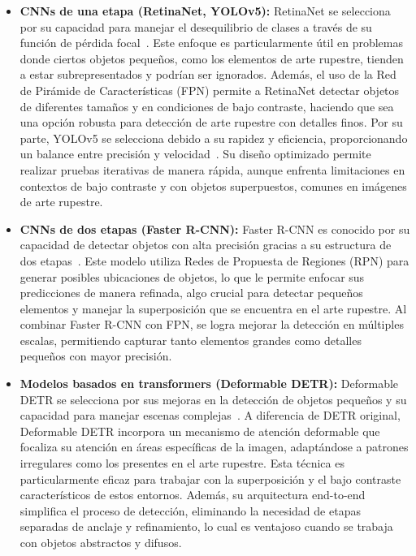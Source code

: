 \begin{itemize}
    \item \textbf{CNNs de una etapa (RetinaNet, YOLOv5):}
    RetinaNet se selecciona por su capacidad para manejar el desequilibrio de clases a través de su función de pérdida focal~\cite{lin2017focal}.
    Este enfoque es particularmente útil en problemas donde ciertos objetos pequeños, como los elementos de arte rupestre, tienden a estar subrepresentados y podrían ser ignorados.
    Además, el uso de la Red de Pirámide de Características (FPN) permite a RetinaNet detectar objetos de diferentes tamaños y en condiciones de bajo contraste, haciendo que sea una opción robusta para detección de arte rupestre con detalles finos.
    Por su parte, YOLOv5 se selecciona debido a su rapidez y eficiencia, proporcionando un balance entre precisión y velocidad~\cite{yolov5}.
    Su diseño optimizado permite realizar pruebas iterativas de manera rápida, aunque enfrenta limitaciones en contextos de bajo contraste y con objetos superpuestos, comunes en imágenes de arte rupestre.

    \item \textbf{CNNs de dos etapas (Faster R-CNN):}
    Faster R-CNN es conocido por su capacidad de detectar objetos con alta precisión gracias a su estructura de dos etapas~\cite{ren2015faster}.
    Este modelo utiliza Redes de Propuesta de Regiones (RPN) para generar posibles ubicaciones de objetos, lo que le permite enfocar sus predicciones de manera refinada, algo crucial para detectar pequeños elementos y manejar la superposición que se encuentra en el arte rupestre.
    Al combinar Faster R-CNN con FPN, se logra mejorar la detección en múltiples escalas, permitiendo capturar tanto elementos grandes como detalles pequeños con mayor precisión.

    \item \textbf{Modelos basados en transformers (Deformable DETR):}
    Deformable DETR se selecciona por sus mejoras en la detección de objetos pequeños y su capacidad para manejar escenas complejas~\cite{zhu2021}.
    A diferencia de DETR original, Deformable DETR incorpora un mecanismo de atención deformable que focaliza su atención en áreas específicas de la imagen, adaptándose a patrones irregulares como los presentes en el arte rupestre.
    Esta técnica es particularmente eficaz para trabajar con la superposición y el bajo contraste característicos de estos entornos.
    Además, su arquitectura end-to-end simplifica el proceso de detección, eliminando la necesidad de etapas separadas de anclaje y refinamiento, lo cual es ventajoso cuando se trabaja con objetos abstractos y difusos.
\end{itemize}

